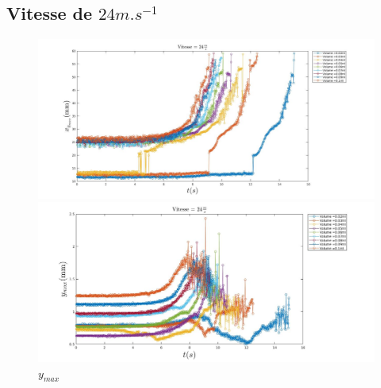 \subsection{Vitesse de $24m.s^{-1}$}

\begin{figure}[!h]
	\centering
	\begin{minipage}{0.95\linewidth}
	\includegraphics[width = \linewidth]{./image/v=24xm.jpg}
	\caption{$x_{max}$}
	\end{minipage}
	\begin{minipage}{0.95\linewidth}
	\includegraphics[width = \linewidth]{./image/v=24ym.jpg}
	\caption{$y_{max}$}
	\end{minipage}
\end{figure}
